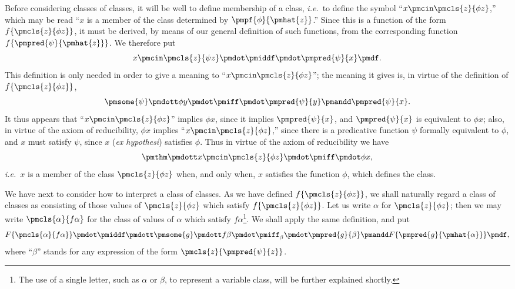 \documentclass[letterpaper,12pt,openany,leqno]{book}
\begin{document}
Before considering classes of classes, it will be well to define membership of a class, \textit{i.e.}\ to define the symbol ``$x \pmcin \pmcls{z}{\phi z}$,'' which may be read ``$x$ is a member of the class determined by $\pmpf{\phi}{\pmhat{z}}$.'' Since this is a function of the form $f\{\pmcls{z}{\phi z}\}$, it must be derived, by means of our general definition of such functions, from the corresponding function $f\{\pmpred{\psi}{\pmhat{z}}\}$. We therefore put
\[
	x \pmcin \pmcls{z}{\psi z} \pmdot \pmiddf \pmdot \pmpred{\psi}{x} \pmdf.
\]
This definition is only needed in order to give a meaning to ``$x \pmcin \pmcls{z}{\phi z}$''; the meaning it gives is, in virtue of the definition of $f\{\pmcls{z}{\phi z}\}$,
\[
	\pmsome{\psi} \pmdott \phi y \pmdot \pmiff \pmdot \pmpred{\psi}{y} \pmandd \pmpred{\psi}{x}.
\]
It thus appears that ``$x \pmcin \pmcls{z}{\phi z}$'' implies $\phi x$, since it implies $\pmpred{\psi}{x}$, and $\pmpred{\psi}{x}$ is equivalent to $\phi x$; also, in virtue of the axiom of reducibility, $\phi x$ implies ``$x \pmcin \pmcls{z}{\phi z}$,'' since there is a predicative function $\psi$ formally equivalent to $\phi$, and $x$ must satisfy $\psi$, since $x$ (\textit{ex hypothesi}) satisfies $\phi$. Thus in virtue of the axiom of reducibility we have
\[
	\pmthm \pmdott x \pmcin \pmcls{z}{\phi z} \pmdot \pmiff \pmdot \phi x,
\]
\textit{i.e.}\ $x$ is a member of the class $\pmcls{z}{\phi z}$ when, and only when, $x$ satisfies the function $\phi$, which defines the class.

We have next to consider how to interpret a class of classes. As we have defined $f\{\pmcls{z}{\phi z}\}$, we shall naturally regard a class of classes as consisting of those values of $\pmcls{z}{\phi z}$ which satisfy $f\{\pmcls{z}{\phi z}\}$. Let us write $\alpha$ for $\pmcls{z}{\phi z}$; then we may write $\pmcls{\alpha}{f \alpha}$ for the class of values of $\alpha$ which satisfy $f\alpha$\footnote{The use of a single letter, such as $\alpha$ or $\beta$, to represent a variable class, will be further explained shortly.}. We shall apply the same definition, and put
\[
	F\{\pmcls{\alpha}{f \alpha}\} \pmdot \pmiddf \pmdott \pmsome{g}\pmdott f\beta \pmdot \pmiff_\beta \pmdot \pmpred{g}{\beta} \pmandd F\{\pmpred{g}{\pmhat{\alpha}}\} \pmdf,
\]
where ``$\beta$'' stands for any expression of the form $\pmcls{z}{\pmpred{\psi}{z}}$.
\end{document}
